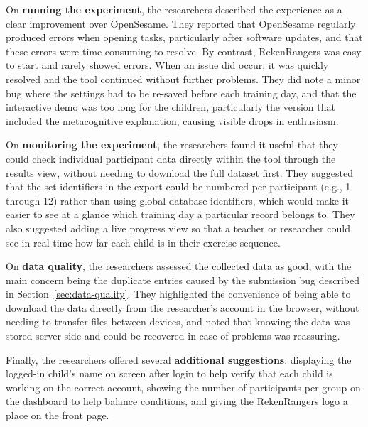 On \textbf{running the experiment}, the researchers described the experience as a clear improvement over OpenSesame. They reported that OpenSesame regularly produced errors when opening tasks, particularly after software updates, and that these errors were time-consuming to resolve. By contrast, RekenRangers was easy to start and rarely showed errors. When an issue did occur, it was quickly resolved and the tool continued without further problems. They did note a minor bug where the settings had to be re-saved before each training day, and that the interactive demo was too long for the children, particularly the version that included the metacognitive explanation, causing visible drops in enthusiasm.

On \textbf{monitoring the experiment}, the researchers found it useful that they could check individual participant data directly within the tool through the results view, without needing to download the full dataset first. They suggested that the set identifiers in the export could be numbered per participant (e.g., 1 through 12) rather than using global database identifiers, which would make it easier to see at a glance which training day a particular record belongs to. They also suggested adding a live progress view so that a teacher or researcher could see in real time how far each child is in their exercise sequence.

On \textbf{data quality}, the researchers assessed the collected data as good, with the main concern being the duplicate entries caused by the submission bug described in Section~\ref{sec:data-quality}. They highlighted the convenience of being able to download the data directly from the researcher's account in the browser, without needing to transfer files between devices, and noted that knowing the data was stored server-side and could be recovered in case of problems was reassuring.

Finally, the researchers offered several \textbf{additional suggestions}: displaying the logged-in child's name on screen after login to help verify that each child is working on the correct account, showing the number of participants per group on the dashboard to help balance conditions, and giving the RekenRangers logo a place on the front page.